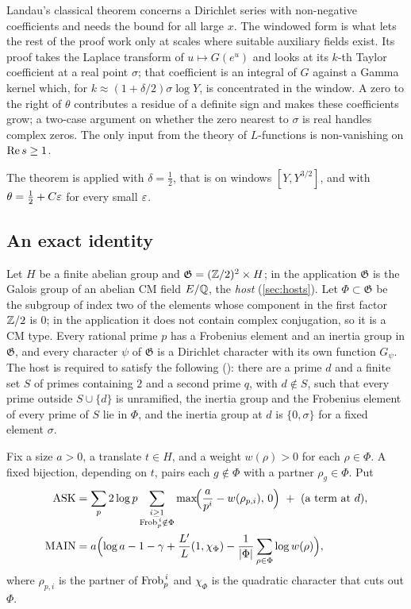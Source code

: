 Landau's classical theorem \cite{landau1905} concerns a Dirichlet series with non-negative
coefficients and needs the bound for all large $x$. The windowed form is what lets the rest of
the proof work only at scales where suitable auxiliary fields exist. Its proof
takes the Laplace transform of $u\mapsto G(e^u)$ and looks at its $k$-th Taylor
coefficient at a real point $\sigma$; that coefficient is an integral of $G$ against a Gamma
kernel which, for $k\approx(1+\delta/2)\sigma\log Y$, is concentrated in the window. A zero to
the right of $\theta$ contributes a residue of a definite sign and makes these coefficients
grow; a two-case argument on whether the zero nearest to $\sigma$ is real handles complex
zeros. The only input from the theory of $L$-functions is non-vanishing on $\operatorname{Re} s\ge1$.

The theorem is applied with $\delta=\tfrac12$, that is on windows $[Y,Y^{3/2}]$, and with
$\theta=\tfrac12+C\varepsilon$ for every small $\varepsilon$.

\subsection{An exact identity}\label{sec:identity}
Let $H$ be a finite abelian group and $\mathfrak G=(\mathbb{Z}/2)^2\times H$; in the application
$\mathfrak G$ is the Galois group of an abelian CM field $E/\mathbb{Q}$, the \emph{host}
(\cref{sec:hosts}). Let $\Phi\subset\mathfrak G$ be the subgroup of index two of the elements
whose component in the first factor $\mathbb{Z}/2$ is $0$; in the application it does not contain
complex conjugation, so it is a CM type. Every rational prime $p$ has a Frobenius element and an inertia group in
$\mathfrak G$, and every character $\psi$ of $\mathfrak G$ is a Dirichlet character with its own
function $G_\psi$. The host is required to satisfy the following \lvS{}
(): there are a prime $d$ and a finite set $S$ of primes containing $2$ and a
second prime $q$, with $d\notin S$, such that every prime outside $S\cup\{d\}$ is unramified,
the inertia group and the Frobenius element of every prime of $S$ lie in $\Phi$, and the inertia
group at $d$ is $\{0,\sigma\}$ for a fixed element $\sigma$.

Fix a size $a>0$, a translate $t\in H$, and a weight $w(\rho)>0$ for each $\rho\in\Phi$. A fixed
bijection, depending on $t$, pairs each $g\notin\Phi$ with a partner $\rho_g\in\Phi$. Put
\begin{align}
\mathrm{ASK} &= \sum_{p}2\log p\sum_{\substack{i\ge1\\ \operatorname{Frob}_p^{\,i}\notin\Phi}}
        \max\!\Bigl(\frac{a}{p^{i}}-w(\rho_{p,i}),\,0\Bigr)\ +\ (\text{a term at } d),
        \label{eq:ask}\\
\mathrm{MAIN} &= a\Bigl(\log a-1-\gamma+\frac{L'}{L}(1,\chi_\Phi)
        -\frac1{\lvert \Phi\rvert}\sum_{\rho\in\Phi}\log w(\rho)\Bigr),\label{eq:main}
\end{align}
where $\rho_{p,i}$ is the partner of $\operatorname{Frob}_p^{\,i}$ and $\chi_\Phi$ is the quadratic character
that cuts out $\Phi$.

